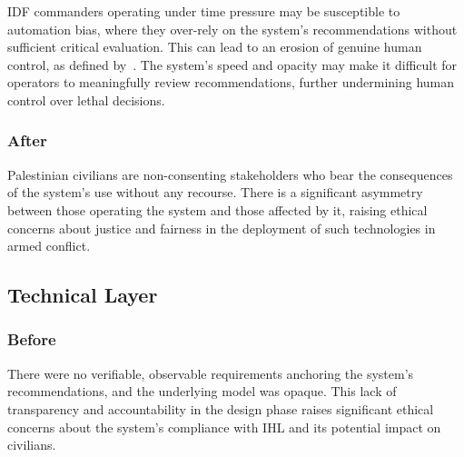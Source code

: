 IDF commanders operating under time pressure may be susceptible to automation bias, where they over-rely on the system's recommendations without sufficient critical evaluation. This can lead to an erosion of genuine human control, as defined by~\citet{mhcof}. The system's speed and opacity may make it difficult for operators to meaningfully review recommendations, further undermining human control over lethal decisions.


\subsubsection{After}

Palestinian civilians are non-consenting stakeholders who bear the consequences of the system's use without any recourse. There is a significant asymmetry between those operating the system and those affected by it, raising ethical concerns about justice and fairness in the deployment of such technologies in armed conflict.



\subsection{Technical Layer}


\subsubsection{Before}

There were no verifiable, observable requirements anchoring the system's recommendations, and the underlying model was opaque. This lack of transparency and accountability in the design phase raises significant ethical concerns about the system's compliance with IHL and its potential impact on civilians.

